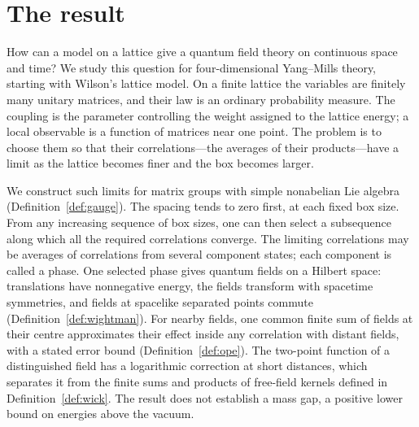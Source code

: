 \section{The result}\label{sec:result}

How can a model on a lattice give a quantum field theory on continuous space and time?
We study this question for four-dimensional Yang--Mills theory, starting with Wilson's lattice model.
On a finite lattice the variables are finitely many unitary matrices, and their law is an ordinary probability measure.
The coupling is the parameter controlling the weight assigned to the lattice energy; a local observable is a function of matrices near one point.
The problem is to choose them so that their correlations---the averages of their products---have a limit as the lattice becomes finer and the box becomes larger.

We construct such limits for matrix groups with simple nonabelian Lie algebra (Definition~\ref{def:gauge}).
The spacing tends to zero first, at each fixed box size.
From any increasing sequence of box sizes, one can then select a subsequence along which all the required correlations converge.
The limiting correlations may be averages of correlations from several component states; each component is called a phase.
One selected phase gives quantum fields on a Hilbert space: translations have nonnegative energy, the fields transform with spacetime symmetries, and fields at spacelike separated points commute (Definition~\ref{def:wightman}).
For nearby fields, one common finite sum of fields at their centre approximates their effect inside any correlation with distant fields, with a stated error bound (Definition~\ref{def:ope}).
The two-point function of a distinguished field has a logarithmic correction at short distances, which separates it from the finite sums and products of free-field kernels defined in Definition~\ref{def:wick}.
The result does not establish a mass gap, a positive lower bound on energies above the vacuum.


